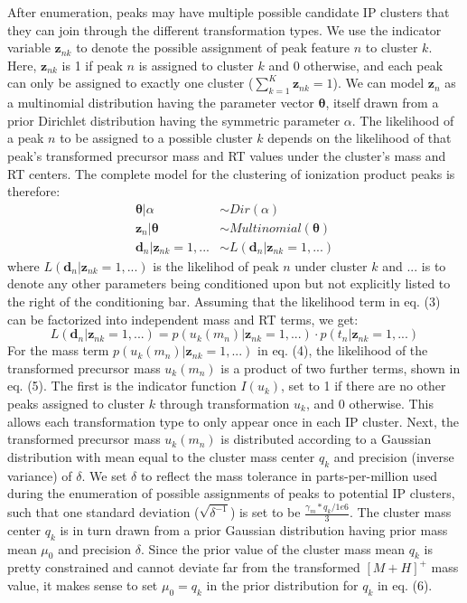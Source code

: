 After enumeration, peaks may have multiple possible candidate IP clusters that they can join through the different transformation types. We use the indicator variable $\boldsymbol{z}_{nk}$ to denote the possible assignment of peak feature $n$ to cluster $k$. Here, $\boldsymbol{z}_{nk}$ is 1 if peak $n$ is assigned to cluster $k$ and 0 otherwise, and each peak can only be assigned to exactly one cluster ($\sum_{k=1}^{K} \boldsymbol{z}_{nk}=1$). We can model $\boldsymbol{z}_{n}$ as a multinomial distribution having the parameter vector $\boldsymbol{\theta}$, itself drawn from a prior Dirichlet distribution having the symmetric parameter $\alpha$. The likelihood of a peak $n$ to be assigned to a possible cluster $k$ depends on the likelihood of that peak's transformed precursor mass and RT values under the cluster's mass and RT centers. The complete model for the clustering of ionization product peaks is therefore:
\begin{align} 
\boldsymbol{\theta}\vert\alpha &\sim Dir(\alpha) \\
\boldsymbol{z}_n\vert\boldsymbol{\theta} &\sim Multinomial(\boldsymbol{\theta}) \\
\boldsymbol{d}_n\vert\boldsymbol{z}_{nk}=1,... &\sim L(\boldsymbol{d}_n\vert\boldsymbol{z}_{nk}=1,...)
\end{align}
where $L(\boldsymbol{d}_n\vert\boldsymbol{z}_{nk}=1,...)$ is the likelihod of peak $n$ under cluster $k$ and $...$ is to denote any other parameters being conditioned upon but not explicitly listed to the right of the conditioning bar. Assuming that the likelihood term in eq. (3) can be factorized into independent mass and RT terms, we get:
\begin{equation}
L(\boldsymbol{d}_n\vert\boldsymbol{z}_{nk}=1,...)=p(u_k(m_n)\vert\boldsymbol{z}_{nk}=1,...) \cdot p(t_n\vert\boldsymbol{z}_{nk}=1,...)
\end{equation}
For the mass term $p(u_k(m_n)\vert\boldsymbol{z}_{nk}=1,...)$ in eq. (4), the likelihood of the transformed precursor mass $u_k(m_n)$ is a product of two further terms, shown in eq. (5). The first is the indicator function $I(u_k)$, set to 1 if there are no other peaks assigned to cluster $k$ through transformation $u_k$, and 0 otherwise. This allows each transformation type to only appear once in each IP cluster. Next, the transformed precursor mass $u_k(m_n)$ is distributed according to a Gaussian distribution with mean equal to the cluster mass center $q_k$ and precision (inverse variance) of $\delta$. We set $\delta$ to reflect the mass tolerance in parts-per-million used during the enumeration of possible assignments of peaks to potential IP clusters, such that one standard deviation ($\sqrt{\delta^{-1}}$) is set to be $\frac{\gamma_m*q_k/1e6}{3}$. The cluster mass center $q_k$ is in turn drawn from a prior Gaussian distribution having prior mass mean $\mu_0$ and precision $\delta$. Since the prior value of the cluster mass mean $q_k$ is pretty constrained and cannot deviate far from the transformed $[M+H]^+$ mass value, it makes sense to set $\mu_0=q_k$ in the prior distribution for $q_k$ in eq. (6).
